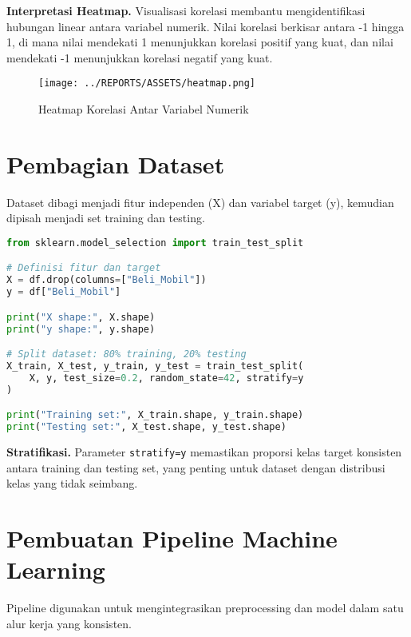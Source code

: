 \documentclass[11pt,a4paper]{article}
\begin{document}
    \noindent\textbf{Interpretasi Heatmap.} Visualisasi korelasi membantu mengidentifikasi hubungan linear antara variabel numerik. Nilai korelasi berkisar antara -1 hingga 1, di mana nilai mendekati 1 menunjukkan korelasi positif yang kuat, dan nilai mendekati -1 menunjukkan korelasi negatif yang kuat.

    \begin{figure}[h!]
        \centering
        \texttt{[image: ../REPORTS/ASSETS/heatmap.png]}
        \caption{Heatmap Korelasi Antar Variabel Numerik}
        \label{fig:heatmap}
    \end{figure}


    \section{Pembagian Dataset}
    Dataset dibagi menjadi fitur independen (X) dan variabel target (y), kemudian dipisah menjadi set training dan testing.

    \begin{codebox}
        \begin{lstlisting}[language=Python]
from sklearn.model_selection import train_test_split

# Definisi fitur dan target
X = df.drop(columns=["Beli_Mobil"])
y = df["Beli_Mobil"]

print("X shape:", X.shape)
print("y shape:", y.shape)

# Split dataset: 80% training, 20% testing
X_train, X_test, y_train, y_test = train_test_split(
    X, y, test_size=0.2, random_state=42, stratify=y
)

print("Training set:", X_train.shape, y_train.shape)
print("Testing set:", X_test.shape, y_test.shape)
        \end{lstlisting}
    \end{codebox}

    \noindent\textbf{Stratifikasi.} Parameter \texttt{stratify=y} memastikan proporsi kelas target konsisten antara training dan testing set, yang penting untuk dataset dengan distribusi kelas yang tidak seimbang.


    \section{Pembuatan Pipeline Machine Learning}
    Pipeline digunakan untuk mengintegrasikan preprocessing dan model dalam satu alur kerja yang konsisten.
\end{document}
